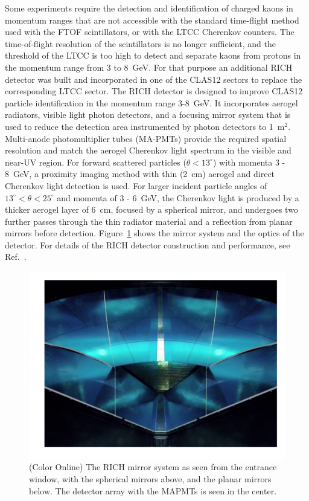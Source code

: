 \documentclass[final,3p,twocolumn]{elsarticle}
\begin{document}
Some experiments require the detection and identification of charged kaons in momentum ranges that are not 
accessible with the standard time-flight method used with the FTOF scintillators, or with the LTCC Cherenkov
counters. The time-of-flight resolution of the scintillators is no longer sufficient, and the threshold of the LTCC
is too high to detect and separate kaons from protons in the momentum range from 3 to 8~GeV. For that purpose
an additional RICH detector was built and incorporated in one of the CLAS12 sectors to replace the corresponding
LTCC sector. The RICH detector is designed to improve CLAS12 particle identification in the momentum range
3-8~GeV. It incorporates aerogel radiators, visible light photon detectors, and a focusing mirror system that is
used to reduce the detection area instrumented by photon detectors to 1~m$^2$.  Multi-anode photomultiplier
tubes (MA-PMTs) provide the required spatial resolution and match the aerogel Cherenkov light spectrum in the
visible and near-UV region. For forward scattered particles ($\theta < 13^\circ$) with momenta 3 - 8~GeV, a
proximity imaging method with thin (2~cm) aerogel and direct Cherenkov light detection is used. For larger incident
particle angles of $13^\circ < \theta < 25^\circ$ and momenta of 3 - 6~GeV, the Cherenkov light is produced by a
thicker aerogel layer of 6~cm, focused by a spherical mirror, and undergoes two further passes through the
thin radiator material and a reflection from planar mirrors before detection. Figure~\ref{rich} shows the mirror
system and the optics of the detector. For details of the RICH detector construction and performance, see
Ref.~\cite{RICH}.

\begin{figure}[htbp!]
\centerline{\includegraphics[width=2.0\columnwidth]{rich-mirrors.png}}
\caption{(Color Online) The RICH mirror system as seen from the entrance window, with the spherical mirrors above, and
the planar mirrors below. The detector array with the MAPMTs is seen in the center.}
\label{rich}
\end{figure}
\end{document}
